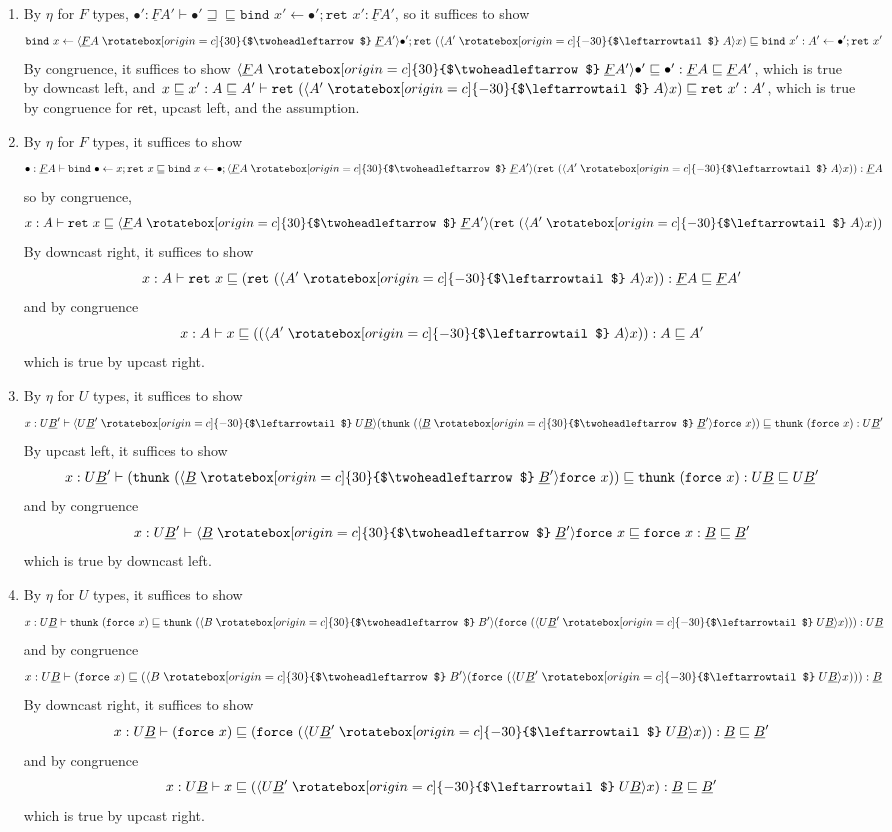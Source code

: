 \documentclass[acmsmall,screen,12pt]{acmart}
\renewcommand{\u}{\underline}
\newcommand{\ltdyn}{\sqsubseteq}
\newcommand{\gtdyn}{\sqsupseteq}
\newcommand{\equidyn}{\mathrel{\gtdyn\ltdyn}}
\newcommand{\uarrow}{\mathrel{\rotatebox[origin=c]{-30}{$\leftarrowtail$}}}
\newcommand{\darrow}{\mathrel{\rotatebox[origin=c]{30}{$\twoheadleftarrow$}}}
\newcommand{\upcast}[2]{\langle{#2}\uarrow{#1}\rangle}
\newcommand{\dncast}[2]{\langle{#1}\darrow{#2}\rangle}
\newcommand{\bindXtoYinZ}[2]{\kw{bind}#2 \leftarrow #1;}
\newcommand{\kw}[1]{\texttt{#1}\,\,}
\newcommand{\ret}{\kw{ret}}
\newcommand{\thunk}{\kw{thunk}}
\newcommand{\force}{\kw{force}}
\begin{document}
\begin{longproof} ~
  \begin{enumerate}
  \item By $\eta$ for $F$ types, $\bullet' : \u F A' \vdash \bullet'
    \equidyn \bindXtoYinZ{\bullet'}{x'}{\ret{x'}} : \u F A'$, so it
    suffices to show
    \[
    \bindXtoYinZ{\dncast{\u F A}{\u F A'}{\bullet'}}{x}{\ret{(\upcast{A}{A'}{x})}} \ltdyn \bindXtoYinZ{\bullet'}{x':A'}{\ret{x'}}
    \]
    By congruence, it suffices to show ${\dncast{\u F A}{\u F
        A'}{\bullet'}} \ltdyn \bullet' : \u F A \ltdyn \u F A'$, which
    is true by downcast left, and 
    $x \ltdyn x' : A \ltdyn A' \vdash {\ret{(\upcast{A}{A'}{x})}} \ltdyn
    {\ret{x'}} : A'$,
    which is true by congruence for $\mathsf{ret}$, upcast left, and the assumption.

  \item By $\eta$ for $F$ types, it suffices to show
    \[
    \bullet : \u F A \vdash \bindXtoYinZ{x}{\bullet}{\ret{x}} \ltdyn \bindXtoYinZ{\bullet}{x}{\dncast{\u F A}{\u F A'}{(\ret{(\upcast{A}{A'}{x})})}}  : \u F A
    \]
    so by congruence,
    \[
    x : A \vdash \ret{x} \ltdyn {\dncast{\u F A}{\u F A'}{(\ret{(\upcast{A}{A'}{x})})}}
    \]
    By downcast right, it suffices to show
    \[
    x : A \vdash \ret{x} \ltdyn (\ret{(\upcast{A}{A'}{x})}) : \u F A \ltdyn \u F A'
    \]
    and by congruence 
    \[
    x : A \vdash x \ltdyn ({(\upcast{A}{A'}{x})}) : A \ltdyn A'
    \]
    which is true by upcast right.  
    
  \item By $\eta$ for $U$ types, it suffices to show
    \[
    x : U \u B' \vdash {\upcast{U \u B}{U \u B'}{(\thunk{({\dncast{\u B}{\u B'}{\force x}})})}} \ltdyn \thunk{(\force{x})} : U \u B'
    \]
    By upcast left, it suffices to show
    \[
    x : U \u B' \vdash {(\thunk{({\dncast{\u B}{\u B'}{\force x}})})} \ltdyn \thunk{(\force{x})} : U \u B \ltdyn U \u B'
    \]
    and by congruence 
    \[
    x : U \u B' \vdash {\dncast{\u B}{\u B'}{\force x}} \ltdyn \force{x} : \u B \ltdyn \u B'
    \]
    which is true by downcast left.
    
  \item By $\eta$ for $U$ types, it suffices to show
    \[
    x : U \u B \vdash \thunk{(\force x)} \ltdyn \thunk{(\dncast{B}{B'}{(\force{(\upcast{U \u B}{U \u B'}{x})})})} : U \u B
    \]
    and by congruence
    \[
    x : U \u B \vdash {(\force x)} \ltdyn {(\dncast{B}{B'}{(\force{(\upcast{U \u B}{U \u B'}{x})})})} : \u B
    \]
    By downcast right, it suffices to show
    \[
    x : U \u B \vdash {(\force x)} \ltdyn {(\force{(\upcast{U \u B}{U \u B'}{x})})} : \u B \ltdyn \u B'
    \]
    and by congruence 
    \[
    x : U \u B \vdash {x} \ltdyn {(\upcast{U \u B}{U \u B'}{x})} : \u B \ltdyn \u B'
    \]
    which is true by upcast right.
  \end{enumerate}
\end{longproof}
\end{document}
